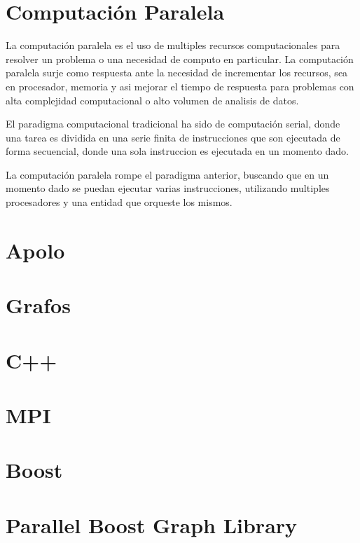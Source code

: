 
	\section{Computación Paralela}

	La computación paralela es el uso de multiples recursos computacionales para resolver un problema o una necesidad de computo en particular. La computación paralela surje como respuesta ante la necesidad de incrementar los recursos, sea en procesador, memoria y asi mejorar el tiempo de respuesta para problemas con alta complejidad computacional o alto volumen de analisis de datos. 

	El paradigma computacional tradicional ha sido de computación serial, donde una tarea es dividida en una serie finita de instrucciones que son ejecutada de forma secuencial, donde una sola instruccion es ejecutada en un momento dado. 

	La computación paralela rompe el paradigma anterior, buscando que en un momento dado se puedan ejecutar varias instrucciones, utilizando multiples procesadores y una entidad que orqueste los mismos.  

	\cite{PCI}
	\cite{SC}

	\section{Apolo}


	\section{Grafos}

	\section{C++}

	\section{MPI}

	\section{Boost}

	


	\section{Parallel Boost Graph Library}

